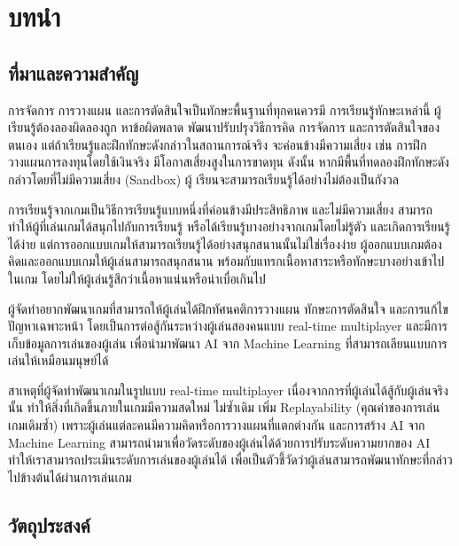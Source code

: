 \documentclass[12pt,oneside,openright,a4paper]{cpe-thai-project}
\begin{document}



\chapter{บทนำ}

\section{ที่มาและความสำคัญ}

การจัดการ การวางแผน และการตัดสินใจเป็นทักษะพื้นฐานที่ทุกคนควรมี 
การเรียนรู้ทักษะเหล่านี้ ผู้เรียนรู้ต้องลองผิดลองถูก หาข้อผิดพลาด พัฒนาปรับปรุงวิธีการคิด 
การจัดการ และการตัดสินใจของตนเอง แต่ถ้าเรียนรู้และฝึกทักษะดังกล่าวในสถานการณ์จริง 
จะค่อนข้างมีความเสี่ยง เช่น การฝึกวางแผนการลงทุนโดยใช้เงินจริง มีโอกาสเสี่ยงสูงในการขาดทุน 
ดังนั้น หากมีพื้นที่ทดลองฝึกทักษะดังกล่าวโดยที่ไม่มีความเสี่ยง (Sandbox) ผู้
เรียนจะสามารถเรียนรู้ได้อย่างไม่ต้องเป็นกังวล

การเรียนรู้จากเกมเป็นวิธีการเรียนรู้แบบหนึ่งที่ค่อนข้างมีประสิทธิภาพ และไม่มีความเสี่ยง 
สามารถทำให้ผู้ที่เล่นเกมได้สนุกไปกับการเรียนรู้ หรือได้เรียนรู้บางอย่างจากเกมโดยไม่รู้ตัว 
และเกิดการเรียนรู้ได้ง่าย แต่การออกแบบเกมให้สามารถเรียนรู้ได้อย่างสนุกสนานนั้นไม่ใช่เรื่องง่าย 
ผู้ออกแบบเกมต้องคิดและออกแบบเกมให้ผู้เล่นสามารถสนุกสนาน พร้อมกับแทรกเนื้อหาสาระหรือทักษะบางอย่างเข้าไปในเกม 
โดยไม่ให้ผู้เล่นรู้สึกว่าเนื้อหาแน่นหรือน่าเบื่อเกินไป

ผู้จัดทำอยากพัฒนาเกมที่สามารถให้ผู้เล่นได้ฝึกทัศนคติการวางแผน ทักษะการตัดสินใจ และการแก้ไขปัญหาเฉพาะหน้า 
โดยเป็นการต่อสู้กันระหว่างผู้เล่นสองคนแบบ real-time multiplayer และมีการเก็บข้อมูลการเล่นของผู้เล่น 
เพื่อนำมาพัฒนา AI จาก Machine Learning ที่สามารถเลียนแบบการเล่นให้เหมือนมนุษย์ได้

สาเหตุที่ผู้จัดทำพัฒนาเกมในรูปแบบ real-time multiplayer เนื่องจากการที่ผู้เล่นได้สู้กับผู้เล่นจริงนั้น
ทำให้สิ่งที่เกิดขึ้นภายในเกมมีความสดใหม่ ไม่ซ้ำเดิม เพิ่ม Replayability (คุณค่าของการเล่นเกมเดิมซ้ำ) 
เพราะผู้เล่นแต่ละคนมีความคิดหรือการวางแผนที่แตกต่างกัน และการสร้าง AI จาก Machine Learning 
สามารถนำมาเพื่อวัดระดับของผู้เล่นได้ด้วยการปรับระดับความยากของ AI ทำให้เราสามารถประเมินระดับการเล่นของผู้เล่นได้ 
เพื่อเป็นตัวชี้วัดว่าผู้เล่นสามารถพัฒนาทักษะที่กล่าวไปข้างต้นได้ผ่านการเล่นเกม


\section{วัตถุประสงค์}
\end{document}
